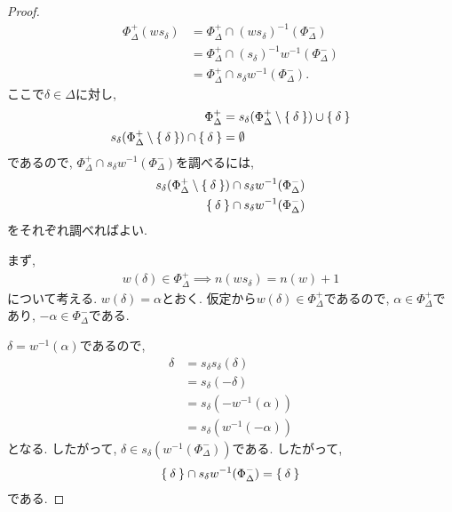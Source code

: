 \begin{proof}
  \begin{align*}
    \Phi_\Delta^{+}(ws_\delta)
    &=\Phi_\Delta^+\cap(ws_\delta)^{-1}(\Phi_\Delta^-)\\
    &=\Phi_\Delta^+\cap(s_\delta)^{-1} w^{-1}(\Phi_\Delta^-)\\
    &=\Phi_\Delta^+\cap s_\delta w^{-1}(\Phi_\Delta^-).
  \end{align*}
  ここで$\delta\in\Delta$に対し,
  \begin{align*}
    \Phi_\Delta^+&=s_\delta(\Phi_\Delta^+\setminus \Set{\delta}) \cup\Set{\delta}\\
    s_\delta(\Phi_\Delta^+\setminus \Set{\delta})\cap \Set{\delta}&=\emptyset
  \end{align*}
  であるので, $\Phi_\Delta^+\cap s_\delta w^{-1}(\Phi_\Delta^-)$を調べるには,
  \begin{align*}
    s_\delta(\Phi_\Delta^+\setminus \Set{\delta}) \cap s_\delta w^{-1}(\Phi_\Delta^-)\\
    \Set{\delta} \cap s_\delta w^{-1}(\Phi_\Delta^-)
  \end{align*}
  をそれぞれ調べればよい.

  まず,
  \begin{align*}
    w(\delta)\in\Phi_\Delta^+ \implies n(ws_\delta)=n(w)+1
  \end{align*}
  について考える.
  $w(\delta)=\alpha$とおく.
  仮定から$w(\delta)\in\Phi_\Delta^+$であるので,
  $\alpha\in\Phi_\Delta^+$であり,
  $-\alpha\in\Phi_\Delta^-$である.
  
  $\delta=w^{-1}(\alpha)$であるので,
  \begin{align*}
    \delta
    &=s_\delta s_\delta(\delta)\\
    &=s_\delta (-\delta)\\
    &=s_\delta(- w^{-1}(\alpha))\\
    &=s_\delta(w^{-1}(-\alpha))
  \end{align*}
  となる. したがって,
  $\delta\in s_\delta(w^{-1}(\Phi_\Delta^-))$である.
  したがって,
  \begin{align*}
    \Set{\delta} \cap s_\delta w^{-1}(\Phi_\Delta^-) = \Set{\delta}
  \end{align*}
  である.
  


\end{proof}
